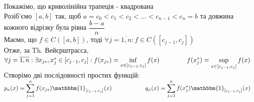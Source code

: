 \documentclass[a4paper, 14pt]{extarticle}
\def\huge{\displaystyle}
\theoremstyle{theoremdd}
\theoremstyle{theoremdd}
\theoremstyle{theoremdd}
\theoremstyle{theoremdd}
\theoremstyle{theoremdd}
\theoremstyle{theoremdd}
\theoremstyle{theoremdd}
\theoremstyle{theoremdd}
\begin{document}
Покажімо, що криволінійна трапеція - квадрована\\
Розіб'ємо $[a,b]$ так, щоб $a = c_0 < c_1 < c_2 < \dots < c_{n-1} < c_n = b$ та довжина кожного відрізку була рівна $\dfrac{b-a}{n}$\\
Маємо, що $f \in C([a,b])$, тоді $\forall j = \overline{1,n}: f \in C([c_{j-1}, c_j])$ \\
Отже, за Th. Вейєрштрасса,
$\forall j = \overline{1,n}: \exists x_{j*}, x^*_j \in [c_{j-1},c_j]: \\ \huge f(x_{j*}) = \inf_{x \in [c_{j-1}, c_j]} f(x) \hspace{1.5cm} f(x^*_{j}) = \sup_{x \in [c_{j-1}, c_j]} f(x)$\\
Створімо дві послідовності простих функцій:\\
$p_n(x) = \huge \sum_{j=1}^n f(x_{j*}) \mathbbm{1}_{[c_{j-1},c_j]}(x) \hspace{2cm} q_n(x) = \huge \sum_{j=1}^n f(x^*_{j}) \mathbbm{1}_{[c_{j-1},c_j]}(x)$
\end{document}
